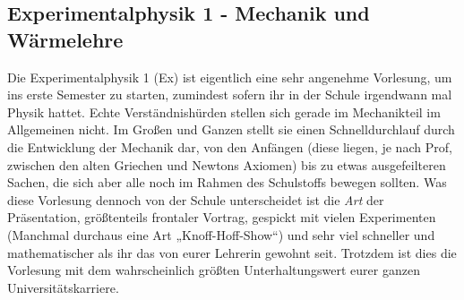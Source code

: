 \subsection{Experimentalphysik 1 - Mechanik und Wärmelehre}
\label{ex1}
Die Experimentalphysik 1 (\gls{Ex}) ist eigentlich eine sehr angenehme Vorlesung, um ins erste Semester zu starten, zumindest sofern ihr in der Schule irgendwann mal Physik hattet. Echte Verständnishürden stellen sich gerade im Mechanikteil im Allgemeinen nicht. Im Großen und Ganzen stellt sie einen Schnelldurchlauf durch die Entwicklung der Mechanik dar, von den Anfängen (diese liegen, je nach Prof, zwischen den alten Griechen und Newtons Axiomen) bis zu etwas ausgefeilteren Sachen, die sich aber alle noch im Rahmen des Schulstoffs bewegen sollten. Was diese Vorlesung dennoch von der Schule unterscheidet ist die \emph{Art} der Präsentation, größtenteils frontaler Vortrag, gespickt mit vielen Experimenten (Manchmal durchaus eine Art „Knoff-Hoff-Show“) und sehr viel schneller und mathematischer als ihr das von eurer Lehrerin gewohnt seit. Trotzdem ist dies die Vorlesung mit dem wahrscheinlich größten Unterhaltungswert eurer ganzen Universitätskarriere.

